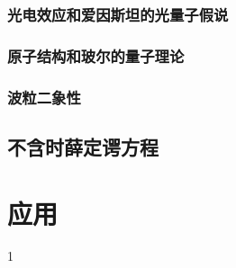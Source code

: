 \documentclass[UTF-8,heading=true,%
	zihao=-4,a4paper]{ctexbook}
\begin{document}
\section{光电效应和爱因斯坦的光量子假说}

\section{原子结构和玻尔的量子理论}

\section{波粒二象性}

\chapter{不含时薛定谔方程}

\part{应\qquad 用}
1
\end{document}
